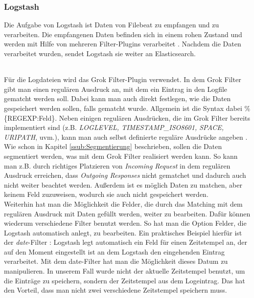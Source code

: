 \subsubsection{Logstash}
\label{sub:Logstash}
Die Aufgabe von Logstash ist Daten von Filebeat zu empfangen und zu verarbeiten. Die empfangenen Daten befinden sich in einem rohen Zustand und werden mit Hilfe von mehreren Filter-Plugins verarbeitet \citep{LoFi20}. Nachdem die Daten verarbeitet wurden, sendet Logstash sie weiter an Elasticsearch.

\\
Für die Logdateien wird das Grok Filter-Plugin verwendet. In dem Grok Filter gibt man einen regulären Ausdruck an, mit dem ein Eintrag in den Logfile gematcht werden soll. Dabei kann man auch direkt festlegen, wie die Daten gespeichert werden sollen, falls gematcht wurde. Allgemein ist die Syntax dabei \%\{REGEXP:Feld\}. Neben einigen regulären Ausdrücken, die im Grok Filter bereits implementiert sind (z.B. \textit{LOGLEVEL, TIMESTAMP\_ISO8601, SPACE, URIPATH}, uvm.), kann man auch selbst definierte reguläre Ausdrücke angeben \citep{Ho16}.
Wie schon in Kapitel \ref{ssub:Segmentierung} beschrieben, sollen die Daten segmentiert werden, was mit dem Grok Filter realisiert werden kann. So kann man z.B. durch richtiges Platzieren von \textit{Incoming Request} in dem regulären Ausdruck erreichen, dass \textit{Outgoing Responses} nicht gematchet und dadurch auch nicht weiter beachtet werden. Außerdem ist es möglich Daten zu matchen, aber keinem Feld zuzuweisen, wodurch sie auch nicht gespeichert werden.\\
Weiterhin hat man die Möglichkeit die Felder, die durch das Matching mit dem regulären Ausdruck mit Daten gefüllt werden, weiter zu bearbeiten. Dafür können wiederum verschiedene Filter benutzt werden. So hat man die Option Felder, die Logstash automatisch anlegt, zu bearbeiten. Ein praktisches Beispiel hierfür ist der \textit{date}-Filter \citep{Ho16}: Logstash legt automatisch ein Feld für einen Zeitstempel an, der auf den Moment eingestellt ist an dem Logstash den eingehenden Eintrag verarbeitet. Mit dem date-Filter hat man die Möglichkeit dieses Datum zu manipulieren. In unserem Fall wurde nicht der aktuelle Zeitstempel benutzt, um die Einträge zu speichern, sondern der Zeitstempel aus dem Logeintrag. Das hat den Vorteil, dass man nicht zwei verschiedene Zeitstempel speichern muss.

